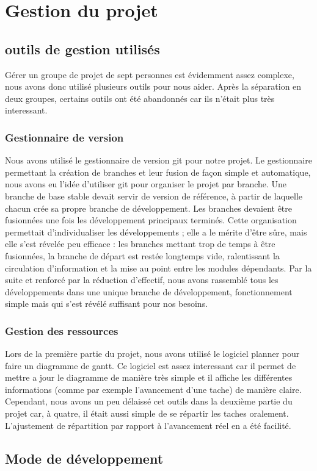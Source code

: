 \chapter{Gestion du projet}

\section{outils de gestion utilisés}

Gérer un groupe de projet de sept personnes est évidemment assez complexe, nous avons donc utilisé plusieurs outils pour nous aider. Après la séparation en deux groupes, certains outils ont été abandonnés car ils n'était plus très interessant.

\subsection{Gestionnaire de version}

Nous avons utilisé le gestionnaire de version git pour notre projet. Le gestionnaire permettant la création de branches et leur fusion de façon simple et automatique, nous avons eu l'idée d'utiliser git pour organiser le projet par branche. Une branche de base stable devait servir de version de référence, à partir de laquelle chacun crée sa propre branche de développement. Les branches devaient être fusionnées une fois les développement principaux terminés. Cette organisation permettait d'individualiser les développements ; elle a le mérite d'être sûre, mais elle s'est révelée peu efficace : les branches mettant trop de temps à être fusionnées, la branche de départ est restée longtemps vide, ralentissant la circulation d'information et la mise au point entre les modules dépendants. Par la suite et renforcé par la réduction d'effectif, nous avons rassemblé tous les développements dans une unique branche de développement, fonctionnement simple mais qui s'est révélé suffisant pour nos besoins. 

\subsection{Gestion des ressources}

Lors de la première partie du projet, nous avons utilisé le logiciel planner pour faire un diagramme de gantt. Ce logiciel est assez interessant car il permet de mettre a jour le diagramme de manière très simple et il affiche les différentes informations (comme par exemple l'avancement d'une tache) de manière claire.
Cependant, nous avons un peu délaissé cet outils dans la deuxième partie du projet car, à quatre, il était aussi simple de se répartir les taches oralement. L'ajustement de répartition par rapport à l'avancement réel en a été facilité.

\section{Mode de développement}


